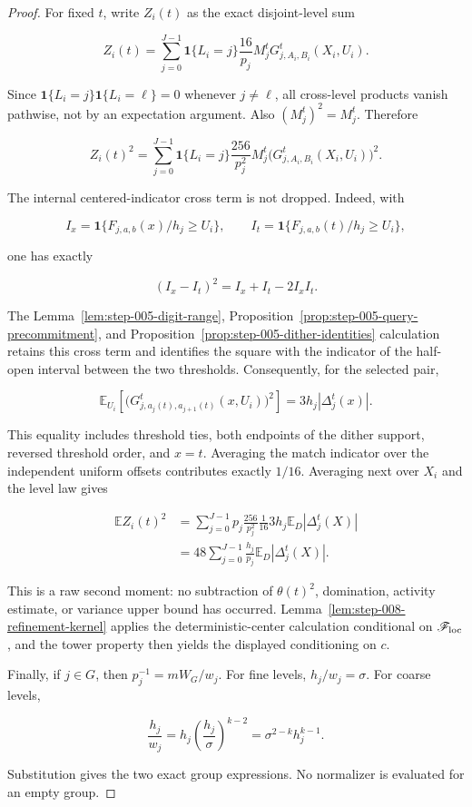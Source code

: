 \begin{proof}
For fixed \(t\), write \(Z_i(t)\) as the exact disjoint-level sum

\[
Z_i(t)
=\sum_{j=0}^{J-1}\mathbf1\{L_i=j\}
\frac{16}{p_j}M_j^tG_{j,A_i,B_i}^t(X_i,U_i).
\]

Since \(\mathbf1\{L_i=j\}\mathbf1\{L_i=\ell\}=0\) whenever \(j\neq\ell\), all cross-level products vanish pathwise, not by an expectation argument. Also \((M_j^t)^2=M_j^t\). Therefore

\[
Z_i(t)^2
=\sum_{j=0}^{J-1}\mathbf1\{L_i=j\}
\frac{256}{p_j^2}M_j^t
\bigl(G_{j,A_i,B_i}^t(X_i,U_i)\bigr)^2.
\]

The internal centered-indicator cross term is not dropped. Indeed, with

\[
I_x=\mathbf1\{F_{j,a,b}(x)/h_j\geq U_i\},
\qquad
I_t=\mathbf1\{F_{j,a,b}(t)/h_j\geq U_i\},
\]

one has exactly

\[
(I_x-I_t)^2=I_x+I_t-2I_xI_t.
\]

The Lemma~\ref{lem:step-005-digit-range}, Proposition~\ref{prop:step-005-query-precommitment}, and Proposition~\ref{prop:step-005-dither-identities} calculation retains this cross term and identifies the square with the indicator of the half-open interval between the two thresholds. Consequently, for the selected pair,

\[
\mathbb E_{U_i}\left[
\bigl(G_{j,a_j(t),a_{j+1}(t)}^t(x,U_i)\bigr)^2
\right]
=3h_j|\Delta_j^t(x)|.
\]

This equality includes threshold ties, both endpoints of the dither support, reversed threshold order, and \(x=t\). Averaging the match indicator over the independent uniform offsets contributes exactly \(1/16\). Averaging next over \(X_i\) and the level law gives

\[
\begin{aligned}
\mathbb E Z_i(t)^2
&=\sum_{j=0}^{J-1}
p_j\frac{256}{p_j^2}\frac1{16}
3h_j\mathbb E_D|\Delta_j^t(X)|\\
&=48\sum_{j=0}^{J-1}\frac{h_j}{p_j}
\mathbb E_D|\Delta_j^t(X)|.
\end{aligned}
\]

This is a raw second moment: no subtraction of \(\theta(t)^2\), domination, activity estimate, or variance upper bound has occurred. Lemma~\ref{lem:step-008-refinement-kernel} applies the deterministic-center calculation conditional on \(\mathscr F_{\rm loc}\), and the tower property then yields the displayed conditioning on \(c\).

Finally, if \(j\in G\), then \(p_j^{-1}=mW_G/w_j\). For fine levels, \(h_j/w_j=\sigma\). For coarse levels,

\[
\frac{h_j}{w_j}
=h_j\left(\frac{h_j}{\sigma}\right)^{k-2}
=\sigma^{2-k}h_j^{k-1}.
\]

Substitution gives the two exact group expressions. No normalizer is evaluated for an empty group.
\end{proof}

